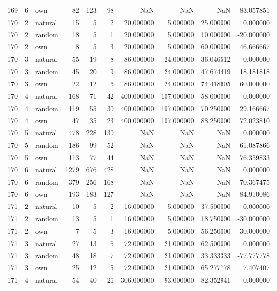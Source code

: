 \begin{table}[htbp]
\begin{tabular}{rrlrrrrrrr}
169 & 6 & own & 82 & 123 & 98 & NaN & NaN & NaN & 83.057851 \\
170 & 2 & natural & 15 & 5 & 2 & 20.000000 & 5.000000 & 25.000000 & 0.000000 \\
170 & 2 & random & 18 & 5 & 1 & 20.000000 & 5.000000 & 10.000000 & -20.000000 \\
170 & 2 & own & 8 & 5 & 3 & 20.000000 & 5.000000 & 60.000000 & 46.666667 \\
170 & 3 & natural & 55 & 19 & 8 & 86.000000 & 24.000000 & 36.046512 & 0.000000 \\
170 & 3 & random & 45 & 20 & 9 & 86.000000 & 24.000000 & 47.674419 & 18.181818 \\
170 & 3 & own & 22 & 12 & 6 & 86.000000 & 24.000000 & 74.418605 & 60.000000 \\
170 & 4 & natural & 168 & 71 & 42 & 400.000000 & 107.000000 & 58.000000 & 0.000000 \\
170 & 4 & random & 119 & 55 & 30 & 400.000000 & 107.000000 & 70.250000 & 29.166667 \\
170 & 4 & own & 47 & 35 & 23 & 400.000000 & 107.000000 & 88.250000 & 72.023810 \\
170 & 5 & natural & 478 & 228 & 130 & NaN & NaN & NaN & 0.000000 \\
170 & 5 & random & 186 & 99 & 52 & NaN & NaN & NaN & 61.087866 \\
170 & 5 & own & 113 & 77 & 44 & NaN & NaN & NaN & 76.359833 \\
170 & 6 & natural & 1279 & 676 & 428 & NaN & NaN & NaN & 0.000000 \\
170 & 6 & random & 379 & 256 & 168 & NaN & NaN & NaN & 70.367475 \\
170 & 6 & own & 193 & 183 & 127 & NaN & NaN & NaN & 84.910086 \\
171 & 2 & natural & 10 & 5 & 2 & 16.000000 & 5.000000 & 37.500000 & 0.000000 \\
171 & 2 & random & 13 & 5 & 1 & 16.000000 & 5.000000 & 18.750000 & -30.000000 \\
171 & 2 & own & 7 & 5 & 3 & 16.000000 & 5.000000 & 56.250000 & 30.000000 \\
171 & 3 & natural & 27 & 13 & 6 & 72.000000 & 21.000000 & 62.500000 & 0.000000 \\
171 & 3 & random & 48 & 18 & 7 & 72.000000 & 21.000000 & 33.333333 & -77.777778 \\
171 & 3 & own & 25 & 12 & 5 & 72.000000 & 21.000000 & 65.277778 & 7.407407 \\
171 & 4 & natural & 54 & 40 & 26 & 306.000000 & 93.000000 & 82.352941 & 0.000000 \\

\end{tabular}
\end{table}
